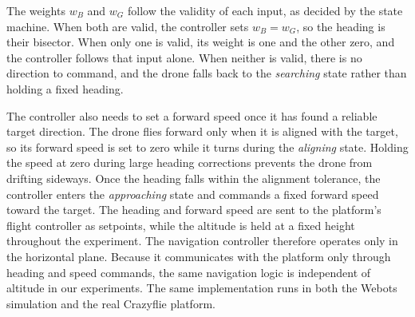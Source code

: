 The weights $w_B$ and $w_G$ follow the validity of each input, as decided by the state machine. When both are valid, the controller sets $w_B = w_G$, so the heading is their bisector. When only one is valid, its weight is one and the other zero, and the controller follows that input alone. When neither is valid, there is no direction to command, and the drone falls back to the \emph{searching} state rather than holding a fixed heading.

The controller also needs to set a forward speed once it has found a reliable target direction. The drone flies forward only when it is aligned with the target, so its forward speed is set to zero while it turns during the \emph{aligning} state. Holding the speed at zero during large heading corrections prevents the drone from drifting sideways. Once the heading falls within the alignment tolerance, the controller enters the \emph{approaching} state and commands a fixed forward speed toward the target. The heading and forward speed are sent to the platform's flight controller as setpoints, while the altitude is held at a fixed height throughout the experiment. The navigation controller therefore operates only in the horizontal plane. Because it communicates with the platform only through heading and speed commands, the same navigation logic is independent of altitude in our experiments. The same implementation runs in both the Webots simulation and the real Crazyflie platform.


